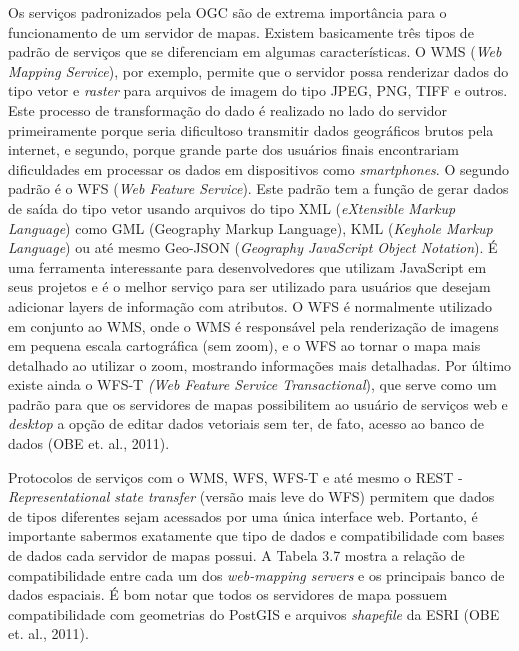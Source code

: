 		Os serviços padronizados pela OGC são de extrema importância para o funcionamento de um servidor de mapas. Existem basicamente três tipos de padrão de serviços que se diferenciam em algumas características. O WMS (\textit{Web Mapping Service}), por exemplo, permite que o servidor possa renderizar dados do tipo vetor e \textit{raster} para arquivos de imagem do tipo JPEG, PNG, TIFF e outros. Este processo de transformação do dado é realizado no lado do servidor primeiramente porque seria dificultoso transmitir dados geográficos brutos pela internet, e segundo, porque grande parte dos usuários finais encontrariam dificuldades em processar os dados em dispositivos como \textit{smartphones}. O segundo padrão é o WFS (\textit{Web Feature Service}). Este padrão tem a função de gerar dados de saída do tipo vetor usando arquivos do tipo XML (\textit{eXtensible Markup Language}) como GML (Geography Markup Language), KML (\textit{Keyhole Markup Language}) ou até mesmo Geo-JSON (\textit{Geography JavaScript Object Notation}). É uma ferramenta interessante para desenvolvedores que utilizam JavaScript em seus projetos e é o melhor serviço para ser utilizado para usuários que desejam adicionar layers de informação com atributos. O WFS é normalmente utilizado em conjunto ao WMS, onde o WMS é responsável pela renderização de imagens em pequena escala cartográfica (sem zoom), e o WFS ao tornar o mapa mais detalhado ao utilizar o zoom, mostrando informações mais detalhadas. Por último existe ainda o WFS-T \textit{(Web Feature Service Transactional}), que serve como um padrão para que os servidores de mapas possibilitem ao usuário de serviços web e \textit{desktop} a opção de editar dados vetoriais sem ter, de fato, acesso ao banco de dados (OBE et. al., 2011). 
		
		Protocolos de serviços com o WMS, WFS, WFS-T e até mesmo o REST - \textit{Representational state transfer} (versão mais leve do WFS) permitem que dados de tipos diferentes sejam acessados por uma única interface web. Portanto, é importante sabermos exatamente que tipo de dados e compatibilidade com bases de dados cada servidor de mapas possui. A Tabela 3.7 mostra a relação de compatibilidade entre cada um dos \textit{web-mapping servers} e os principais banco de dados espaciais. É bom notar que todos os servidores de mapa possuem compatibilidade com geometrias do PostGIS e arquivos \textit{shapefile} da ESRI (OBE et. al., 2011).
		
